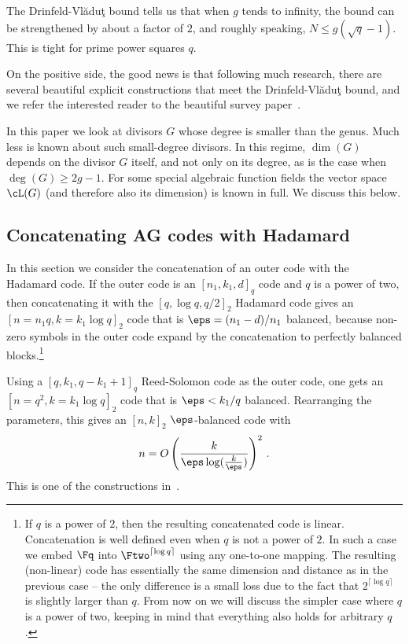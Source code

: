 The Drinfeld-Vl\u{a}du\c{t} bound tells us that when $g$ tends to
infinity, the bound can be strengthened by about a factor of $2$,
and roughly speaking, $N \le g (\sqrt{q}-1)$. This is tight for
prime power squares $q$.

On the positive side, the good news %
is that following much
research, there are several beautiful explicit constructions that
meet the Drinfeld-Vl\u{a}du\c{t} bound, and we refer the interested
reader to the beautiful survey paper~\cite[Chapter 1]{GS:06}.

In this paper we look at divisors $G$ whose degree is smaller than
the genus. Much less is known about such small-degree divisors. In
this regime, $\dim(G)$ depends on the divisor $G$ itself, and not
only on its degree, as is the case when $\deg(G) \ge 2g-1$. For some
special algebraic function fields the vector space $\cL(G)$ (and
therefore also its dimension) is known in full. We discuss this
below.


\subsection{Concatenating AG codes with Hadamard}
\label{sec:hadamard}
In this section we consider the concatenation of an outer code with the Hadamard code.
If the outer code is an $[n_1,k_1,d]_q$ code and $q$ is a power of two, then
concatenating it with the $[q,\log q,q/2]_2$ Hadamard code gives an
$[n=n_1 q, k=k_1 \log q]_2$ code that is $\eps={(n_1-d)}/{n_1}$
balanced, because non-zero symbols in the outer code expand by the
concatenation to perfectly balanced blocks.\footnote{If $q$ is a
power of $2$, then the resulting concatenated code is linear.
Concatenation is well defined even when $q$ is not a power of $2$.
In such a case we embed $\Fq$ into $\Ftwo^{\lceil \log q \rceil}$
using any one-to-one mapping. The resulting (non-linear) code has
essentially the same dimension and distance as in the previous case
-- the only difference is a small loss due to the fact that
$2^{\lceil \log q \rceil}$ is slightly larger than $q$. {}From now on
we will discuss the simpler case where $q$ is a power of two,
keeping in mind that everything also holds for arbitrary $q$.}
%

Using a $[q,k_1,q-k_1+1]_q$ Reed-Solomon code as the outer code, one
gets an $[n=q^2,k=k_1 \log q]_2$ code that is $\eps <{k_1}/{q}$
balanced. Rearranging the parameters, this gives an $[n,k]_2$
$\eps$-balanced code with
\begin{equation}\label{eq:aghp-params}
    n=O \left({k \over \eps \log (\frac{k}{\eps})} \right)^2\,.
\end{equation}
This is one of the constructions in~\cite{AGHP:92}.

